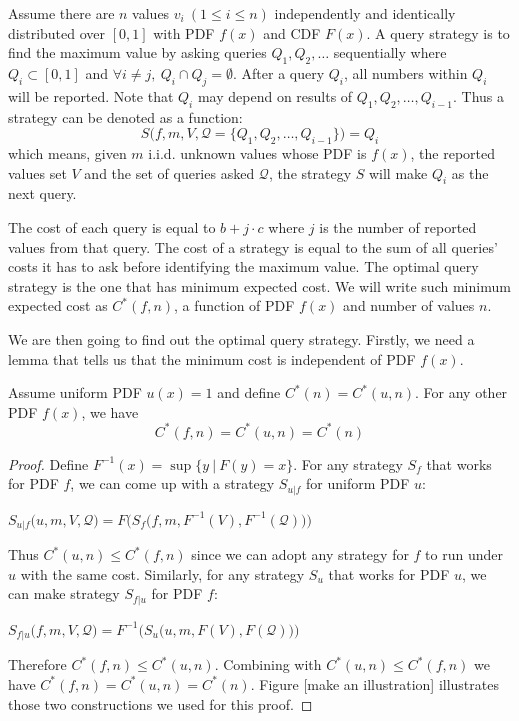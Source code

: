 \begin{definition}\label{def:query}

Assume there are $n$ values $v_i ~(1 \leq i \leq n)$ independently and
identically distributed over $[0, 1]$ with PDF $f(x)$ and CDF $F(x)$.  A query
strategy is to find the maximum value by asking queries $Q_1, Q_2, \ldots$
sequentially where $Q_i \subset [0, 1]$ and $\forall i \neq j, ~Q_i \cap Q_j =
\emptyset$.  After a query $Q_i$, all numbers within $Q_i$ will be reported.
Note that $Q_i$ may depend on results of $Q_1, Q_2, \ldots, Q_{i-1}$. Thus a
strategy can be denoted as a function:
\begin{displaymath}
	S\big(f, m, V, \mathcal Q = \{Q_1, Q_2, \ldots, Q_{i-1} \}\big) = Q_i
\end{displaymath}
which means, given $m$ i.i.d. unknown values whose PDF is $f(x)$, the reported
values set $V$ and the set of queries asked $\mathcal Q$, the strategy $S$ will
make $Q_i$ as the next query.

The cost of each query is equal to $b+j \cdot c$ where $j$ is the number of
reported values from that query. The cost of a strategy is equal to the sum of
all queries' costs it has to ask before identifying the maximum value. The
optimal query strategy is the one that has minimum expected cost.
We will write such minimum expected cost as $C^*(f, n)$, a function
of PDF $f(x)$ and number of values $n$.

\end{definition}

We are then going to find out the optimal query strategy. Firstly, we need
a lemma that tells us that the minimum cost is independent of PDF $f(x)$.

\begin{lemma}\label{lemma:uniform}

Assume uniform PDF $u(x) = 1$ and define $C^*(n) = C^*(u, n)$.
For any other PDF $f(x)$, we have 
\[C^*(f, n) = C^*(u, n) = C^*(n)\]

\end{lemma}

\begin{proof}

Define $F^{-1}(x) = \sup\{y ~|~ F(y) = x\}$. For any strategy $S_f$ that works
for PDF $f$, we can come up with a strategy $S_{u|f}$ for uniform PDF $u$:

$
S_{u|f}\big(u, m, V, \mathcal Q \big) = F\Big( S_f\big( f, m, F^{-1}(V), F^{-1} (\mathcal Q) \big) \Big)
$

Thus $C^*(u, n) \leq C^*(f, n)$ since we can adopt any strategy for $f$ to run
under $u$ with the same cost.  Similarly, for any strategy $S_u$ that works for
PDF $u$, we can make strategy $S_{f|u}$ for PDF $f$:

$
S_{f|u}\big(f, m, V, \mathcal Q \big) = F^{-1}\Big( S_u\big( u, m, F(V), F (\mathcal Q) \big) \Big)
$

Therefore $C^*(f, n) \leq C^*(u, n)$. Combining with $C^*(u, n) \leq C^*(f, n)$
we have $C^*(f, n) = C^*(u, n) = C^*(n)$. Figure [make an illustration]
illustrates those two constructions we used for this proof.

\end{proof}

